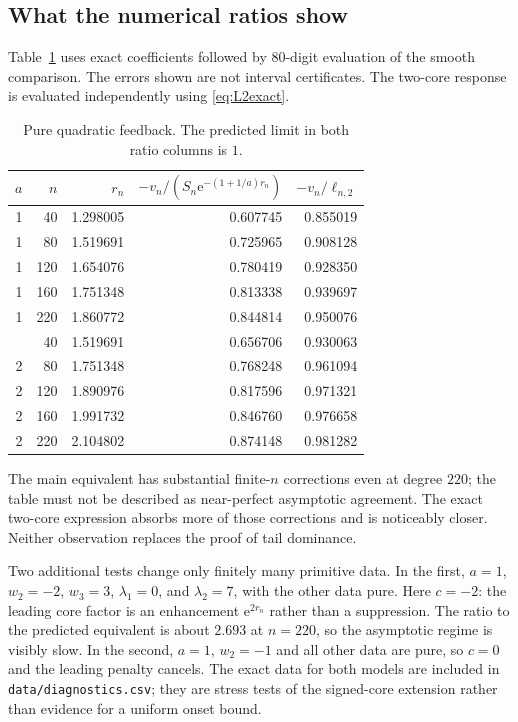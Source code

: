 \documentclass[11pt,a4paper]{article}
\numberwithin{equation}{section}
\theoremstyle{definition}
\theoremstyle{remark}\newtheorem{remark}[theorem]{Remark}
\newcommand{\ee}{\mathrm e}\newcommand{\dd}{\mathrm d}
\begin{document}
\subsection{What the numerical ratios show}
Table~\ref{tab:pure} uses exact coefficients followed by 80-digit evaluation
of the smooth comparison. The errors shown are not interval certificates.
The two-core response is evaluated independently using \eqref{eq:L2exact}.

\begin{table}[htbp]\centering\small
\caption{Pure quadratic feedback. The predicted limit in both ratio columns is $1$.}
\label{tab:pure}
\begin{tabular}{rrrrr}\toprule
$a$&$n$&$r_n$&$-v_n/(S_n\ee^{-(1+1/a)r_n})$&$-v_n/\ell_{n,2}$\\\midrule
1&40&1.298005&0.607745&0.855019\\
1&80&1.519691&0.725965&0.908128\\
1&120&1.654076&0.780419&0.928350\\
1&160&1.751348&0.813338&0.939697\\
1&220&1.860772&0.844814&0.950076\\\addlinespace
2&40&1.519691&0.656706&0.930063\\
2&80&1.751348&0.768248&0.961094\\
2&120&1.890976&0.817596&0.971321\\
2&160&1.991732&0.846760&0.976658\\
2&220&2.104802&0.874148&0.981282\\\bottomrule
\end{tabular}
\end{table}

The main equivalent has substantial finite-$n$ corrections even at degree
$220$; the table must not be described as near-perfect asymptotic agreement.
The exact two-core expression absorbs more of those corrections and is
noticeably closer. Neither observation replaces the proof of tail dominance.

Two additional tests change only finitely many primitive data. In the first,
$a=1$, $w_2=-2$, $w_3=3$, $\lambda_1=0$, and $\lambda_2=7$, with the other
data pure. Here $c=-2$: the leading core factor is an enhancement
$\ee^{2r_n}$ rather than a suppression. The ratio to the predicted equivalent
is about $2.693$ at $n=220$, so the asymptotic regime is visibly slow.
In the second, $a=1$, $w_2=-1$ and all other data are pure, so $c=0$ and
the leading penalty cancels. The exact data for both models are included in
\texttt{data/diagnostics.csv}; they are stress tests of the signed-core
extension rather than evidence for a uniform onset bound.
\end{document}
